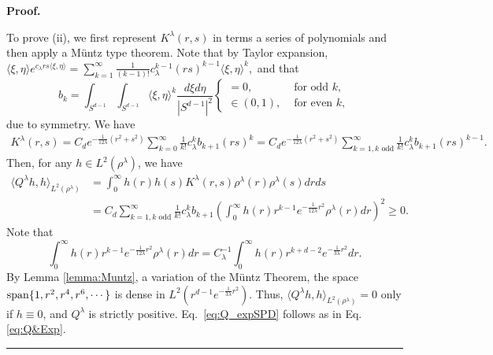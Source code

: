 \documentclass[]{elsarticle}
\def\E{\mathbb{E}}
\def\lambdaG{\lambda}
\newcommand{\inp}[1]{\langle{#1}\rangle}
\newenvironment{proof}[1][Proof]{\noindent\textbf{#1.} }{\ \rule{0.5em}{0.5em}}
\numberwithin{equation}{section}
\numberwithin{theorem}{section}
\begin{document}
\begin{proof}
  
 To prove (ii), we first represent $K^\lambdaG(r,s)$ in terms a series of polynomials and then apply a M\"untz type theorem. 
Note that by  Taylor expansion,
$
\inp{\xi,\eta}  e^{c_\lambdaG rs\inp{\xi,\eta}} 
=\sum_{k=1}^\infty \frac{1}{(k-1)!} c_\lambdaG^{k-1} (rs)^{k-1}  \inp{\xi,\eta}^k, 
$ and that  
\[
b_k=\int_{S^{d-1}}\int_{S^{d-1}} \inp{\xi,\eta}^k  \frac{d\xi d\eta}{|S^{d-1}|^2} \left\{
                \begin{array}{ll}
                  = 0, & \textrm{ for odd } k, \\
                  \in (0,1),   & \textrm{ for even } k,
                \end{array}
              \right. 
 \]
 due to symmetry. We have
\begin{align*}
 K^\lambdaG(r,s)= C_d e^{-\frac{1}{12\lambda}(r^2+s^2)} \sum_{k=0}^\infty \frac{1}{k!} c_\lambdaG^k b_{k+1} (rs)^{k} =C_d e^{-\frac{1}{12\lambda}(r^2+s^2)} \sum_{k=1,k \text{ odd}}^\infty \frac{1}{k!} c_\lambdaG^k b_{k+1} (rs)^{k-1}.
  \end{align*}
Then, for any $h\in L^2(\rho^\lambdaG)$,  we have
\begin{align*}
 \langle Q^\lambdaG h, h\rangle_{L^2(\rho^\lambdaG)}  & = \int_0^\infty h(r)h(s)K^\lambdaG(r,s)  \rho^\lambdaG(r)\rho^\lambdaG(s)drds \\
& = C_d \sum_{k=1, k\text{ odd} }^\infty \frac{1}{k!} c_\lambdaG^k b_{k+1} \left(\int_0^\infty  h(r) r^{k-1} e^{-\frac{1}{12\lambda}r^2} \rho^\lambdaG(r)dr \right)^2\geq 0.
 \end{align*}
 Note that 
 \[ \int_0^\infty  h(r) r^{k-1} e^{-\frac{1}{12\lambda}r^2} \rho^\lambdaG(r)dr  = C_\lambdaG^{-1} \int_0^\infty  h(r) r^{k+d-2}e^{-\frac{1}{3\lambda}r^2} dr.  \]
By Lemma \ref{lemma:Muntz}, a variation of the M\"untz Theorem,  the space ${\rm span}\{1,r^2, r^4, r^6,\cdots\}$ is dense in $L^2(r^{d-1}e^{-\frac{1}{3\lambda}r^2})$.  
Thus, $\langle Q^\lambdaG h, h\rangle_{L^2(\rho^\lambdaG)}=0$ only if $h \equiv 0$, and $Q^\lambdaG$ is strictly positive.  Eq.~\eqref{eq:Q_expSPD} follows as in Eq.\eqref{eq:Q&Exp}.  
\end{proof} 
\end{document}
